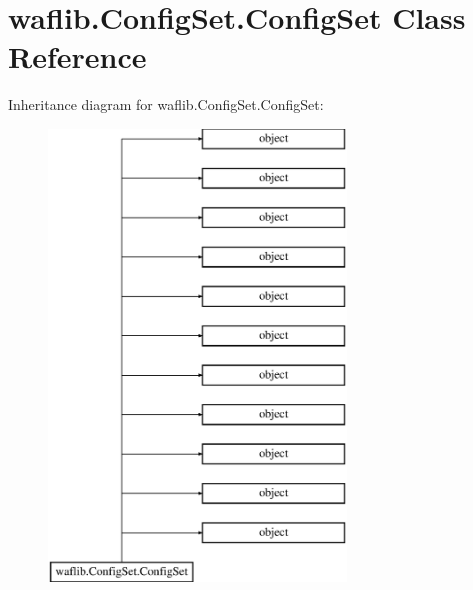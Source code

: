 \hypertarget{classwaflib_1_1_config_set_1_1_config_set}{}\section{waflib.\+Config\+Set.\+Config\+Set Class Reference}
\label{classwaflib_1_1_config_set_1_1_config_set}
Inheritance diagram for waflib.\+Config\+Set.\+Config\+Set\+:\begin{figure}[H]
\begin{center}
\leavevmode
\includegraphics[height=12.000000cm]{classwaflib_1_1_config_set_1_1_config_set}
\end{center}
\end{figure}
